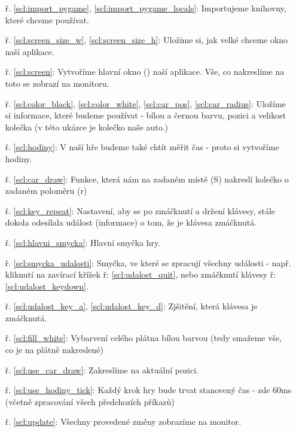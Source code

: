 \begin{minipage}[t]{.45\textwidth}
\begin{enumerate}
\item[ř. \ref{scl:import_pygame}, \ref{scl:import_pygame_locals}:] Importujeme knihovny, které chceme používat.
\item[ř. \ref{scl:screen_size_w}, \ref{scl:screen_size_h}:] Uložíme si, jak velké chceme okno naší aplikace.
\vspace{1.5cm}
\item[ř. \ref{scl:screen}:] Vytvoříme hlavní okno () naší aplikace. Vše, co nakreslíme na toto  se zobrazí na monitoru.
\item[ř. \ref{scl:color_black}, \ref{scl:color_white}, \ref{scl:car_pos}, \ref{scl:car_radius}:] Uložíme si informace, které budeme používat - bílou a černou barvu, pozici a velikost kolečka (v této ukázce je kolečko naše auto.)
\item[ř. \ref{scl:hodiny}:] V naší hře budeme také chtít měřit čas - proto si vytvoříme hodiny.
\vspace{1.8cm}
\item[ř. \ref{scl:car_draw}:] Funkce, která nám na zadaném místě (S) nakreslí kolečko o zadaném poloměru (r)
\item[ř. \ref{scl:key_repeat}:] Nastavení, aby se po zmáčknutí a držení klávesy, stále dokola odesílala událost (informace) o tom, že je klávesa zmáčknutá.
\vspace{1.5cm}
\item[ř. \ref{scl:hlavni_smycka}:] Hlavní smyčka hry.
\item[ř. \ref{scl:smycka_udalosti}:] Smyčka, ve které se zpracují všechny události - např. kliknutí na zavírací křížek ř: \ref{scl:udalost_quit}, nebo zmáčknutí klávesy ř: \ref{scl:udalost_keydown}.
\item[ř. \ref{scl:udalost_key_a}, \ref{scl:udalost_key_d}:] Zjšitění, která klávesa je zmáčknutá.
\item[ř. \ref{scl:fill_white}:] Vybarvení celého plátna bílou barvou (tedy smažeme vše, co je na plátně nakreslené)
\item[ř. \ref{scl:use_car_draw}:] Zakreslíme  na aktuální pozici.
\item[ř. \ref{scl:use_hodiny_tick}:] Každý krok hry bude trvat stanovený čas - zde 60ms (včetně zpracování všech předchozích příkazů)
\item[ř. \ref{scl:update}:] Všechny provedené změny zobrazíme na monitor.
\end{enumerate}
\end{minipage}


